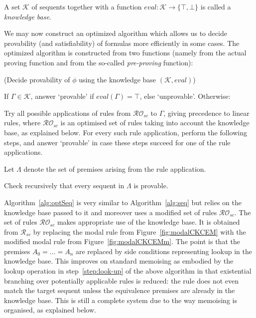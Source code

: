 \documentclass{entcs} \usepackage{entcsmacro}
\newcommand{\eval}{\mathit{eval}}
\begin{document}
\begin{definition}
  A set $\mathcal{K}$ of sequents together with a function
  $\eval:\mathcal{K}\rightarrow \{\top,\bot\}$ is called
  a \emph{knowledge base}.
\end{definition}

\noindent We may now construct an optimized algorithm which allows us
to decide provability (and satisfiability) of formulas more
efficiently in some cases. The optimized algorithm is constructed from
two functions (namely from the actual proving function and from the
so-called \emph{pre-proving} function):

\begin{alg}\label{alg:opt}
  (Decide provability of $\phi$ using the knowledge
  base $(\mathcal{K},\eval)$)
{\upshape
 \begin{algenumerate}
 \item\label{step:look-up} If $\Gamma\in\mathcal{K}$, answer `provable' if
   $\eval(\Gamma)=\top$, else `unprovable'. Otherwise:
 \item\label{step:rule} Try all possible applications of rules from
   $\mathcal{RO}_{sc}$ to $\Gamma$, giving precedence to linear rules,
   where $\mathcal{RO}_{sc}$ is an optimised set of rules taking into
   account the knowledge base, as explained below. For every such rule
   application, perform the following steps, and answer `provable' in
   case these steps succeed for one of the rule applications.
   \item Let $\Lambda$ denote the  set of premises  arising from the rule 
     application.
   \item Check recursively that every sequent in $\Lambda$ is provable.
  \end{algenumerate}
}
\label{alg:optSeq}
\end{alg}

\noindent Algorithm~\ref{alg:optSeq} is very similar to
Algorithm~\ref{alg:seq} but relies on the knowledge base passed to it
and moreover uses a modified set of rules $\mathcal{RO}_{sc}$. The set
of rules $\mathcal{RO}_{sc}$ makes appropriate use of the knowledge
base. It is obtained from $\mathcal{R}_{sc}$ by replacing the modal
rule from Figure~\ref{fig:modalCKCEM} with the modified modal rule
from Figure~\ref{fig:modalCKCEMm}. The point is that the premises
$A_0=\dots=A_n$ are replaced by side conditions representing lookup in
the knowledge base. This improves on standard memoising as embodied by
the lookup operation in step~\ref{step:look-up} of the above algorithm
in that existential branching over potentially applicable rules is
reduced: the rule does not even match the target sequent unless the
equivalence premises are already in the knowledge base. This is still
a complete system due to the way memoising is organised, as explained
below.
\end{document}
